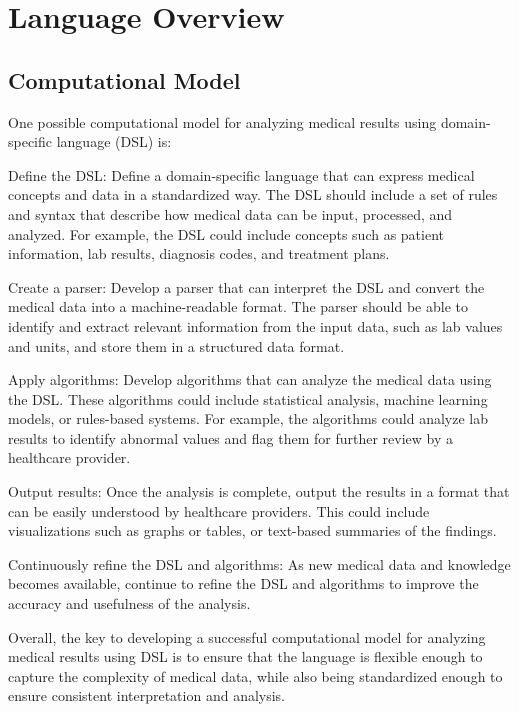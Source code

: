 \chapter{Language Overview}


\section{Computational Model}
One possible computational model for analyzing medical results using domain-specific language (DSL) is:

Define the DSL: Define a domain-specific language that can express medical concepts and data in a standardized way. The DSL should include a set of rules and syntax that describe how medical data can be input, processed, and analyzed. For example, the DSL could include concepts such as patient information, lab results, diagnosis codes, and treatment plans.
\begin{itemize}
\hitem Create a parser: Develop a parser that can interpret the DSL and convert the medical data into a machine-readable format. The parser should be able to identify and extract relevant information from the input data, such as lab values and units, and store them in a structured data format.

\hitem Apply algorithms: Develop algorithms that can analyze the medical data using the DSL. These algorithms could include statistical analysis, machine learning models, or rules-based systems. For example, the algorithms could analyze lab results to identify abnormal values and flag them for further review by a healthcare provider.

\hitem Output results: Once the analysis is complete, output the results in a format that can be easily understood by healthcare providers. This could include visualizations such as graphs or tables, or text-based summaries of the findings.

\hitem Continuously refine the DSL and algorithms: As new medical data and knowledge becomes available, continue to refine the DSL and algorithms to improve the accuracy and usefulness of the analysis.
\end{itemize}

Overall, the key to developing a successful computational model for analyzing medical results using DSL is to ensure that the language is flexible enough to capture the complexity of medical data, while also being standardized enough to ensure consistent interpretation and analysis.



